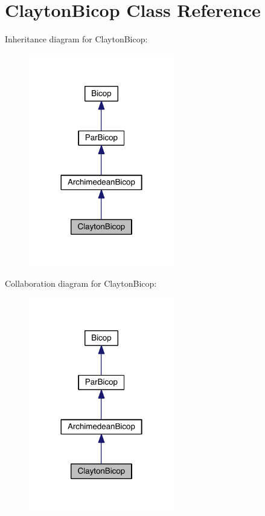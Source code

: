 \hypertarget{class_clayton_bicop}{}\section{Clayton\+Bicop Class Reference}
\label{class_clayton_bicop}


Inheritance diagram for Clayton\+Bicop\+:
\nopagebreak
\begin{figure}[H]
\begin{center}
\leavevmode
\includegraphics[width=180pt]{class_clayton_bicop__inherit__graph}
\end{center}
\end{figure}


Collaboration diagram for Clayton\+Bicop\+:
\nopagebreak
\begin{figure}[H]
\begin{center}
\leavevmode
\includegraphics[width=180pt]{class_clayton_bicop__coll__graph}
\end{center}
\end{figure}
